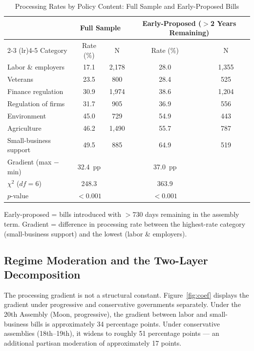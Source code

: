 \documentclass[11pt]{article}
\begin{document}
\begin{table}[htbp]
\centering
\begin{threeparttable}
\caption{Processing Rates by Policy Content: Full Sample and Early-Proposed Bills}
\label{tab:main}
\begin{tabular}{lcccc}
\toprule
& \multicolumn{2}{c}{Full Sample} & \multicolumn{2}{c}{Early-Proposed ($>$2 Years Remaining)} \\
\cmidrule(lr){2-3} \cmidrule(lr){4-5}
Category & Rate (\%) & N & Rate (\%) & N \\
\midrule
Labor \& employers    & 17.1 & 2,178 & 28.0 & 1,355 \\
Veterans              & 23.5 &   800 & 28.4 &   525 \\
Finance regulation    & 30.9 & 1,974 & 38.6 & 1,204 \\
Regulation of firms   & 31.7 &   905 & 36.9 &   556 \\
Environment           & 45.0 &   729 & 54.9 &   443 \\
Agriculture           & 46.2 & 1,490 & 55.7 &   787 \\
Small-business support& 49.5 &   885 & 64.9 &   519 \\
\midrule
Gradient (max $-$ min) & 32.4~pp & & 37.0~pp & \\
$\chi^2$ ($df = 6$)    & 248.3 & & 363.9 & \\
$p$-value              & $< 0.001$ & & $< 0.001$ & \\
\bottomrule
\end{tabular}
\begin{tablenotes}
\footnotesize
\item Early-proposed = bills introduced with $>$730 days remaining in the assembly term. Gradient = difference in processing rate between the highest-rate category (small-business support) and the lowest (labor \& employers).
\end{tablenotes}
\end{threeparttable}
\end{table}

\subsection{Regime Moderation and the Two-Layer Decomposition}

The processing gradient is not a structural constant. Figure~\ref{fig:coef} displays the gradient under progressive and conservative governments separately. Under the 20th Assembly (Moon, progressive), the gradient between labor and small-business bills is approximately 34 percentage points. Under conservative assemblies (18th--19th), it widens to roughly 51 percentage points --- an additional partisan moderation of approximately 17 points.
\end{document}
